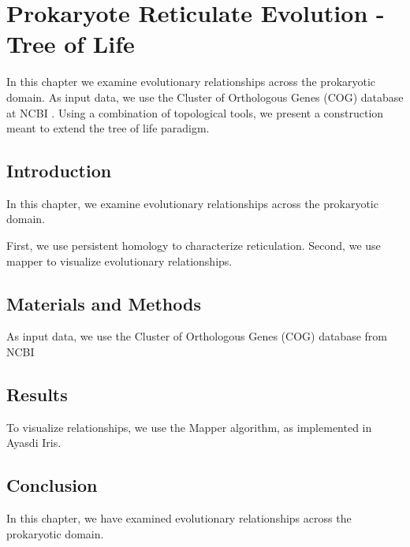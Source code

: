 \chapter{Prokaryote Reticulate Evolution - Tree of Life}
\label{ch:prokaryotes}

In this chapter we examine evolutionary relationships across the prokaryotic domain.
As input data, we use the Cluster of Orthologous Genes (COG) database at NCBI \cite{Galperin:2014ua}.
Using a combination of topological tools, we present a construction meant to extend the tree of life paradigm.

\section{Introduction}

In this chapter, we examine evolutionary relationships across the prokaryotic domain.

First, we use persistent homology to characterize reticulation.
Second, we use mapper to visualize evolutionary relationships.

\section{Materials and Methods}

As input data, we use the Cluster of Orthologous Genes (COG) database from NCBI \cite{Galperin:2014ua}

\section{Results}

To visualize relationships, we use the Mapper algorithm, as implemented in Ayasdi Iris.

\section{Conclusion}

In this chapter, we have examined evolutionary relationships across the prokaryotic domain.